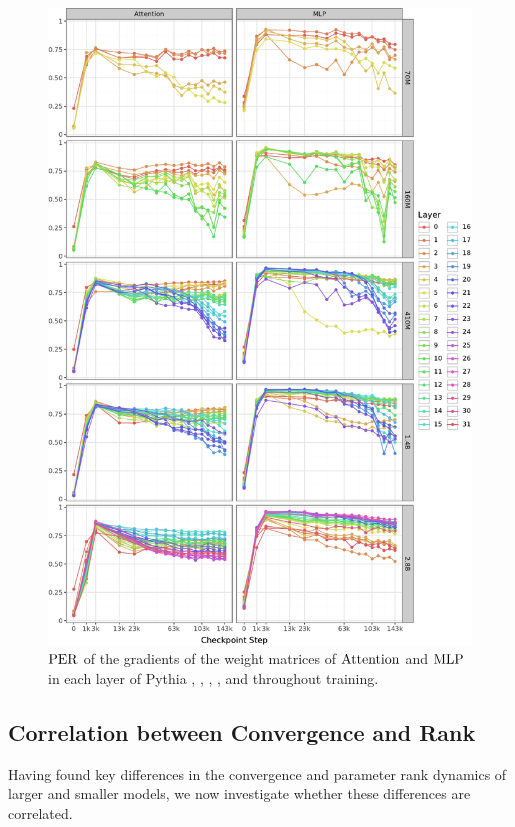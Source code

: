 \begin{figure}[h!]
    \centering
    \includegraphics[width=0.9\linewidth]{chapters/tending-towards-stability/figures/per_grad_lines.pdf}
    \vspace{-5pt}
    \caption{$\mathrm{PER}$ of the gradients of the weight matrices of $\mathrm{Attention}$ and $\mathrm{MLP}$ in each layer of Pythia \sevenmil, \sixmil, \fourmil, \onebil, and \twobil throughout training.}%
    \label{fig:per_grad-layer-wise-lines}
\end{figure}
\clearpage

\subsection{Correlation between Convergence and Rank}
\label{subsec:correlation-cka-per}

Having found key differences in the convergence and parameter rank dynamics of larger and smaller models, we now investigate whether these differences are correlated. 



